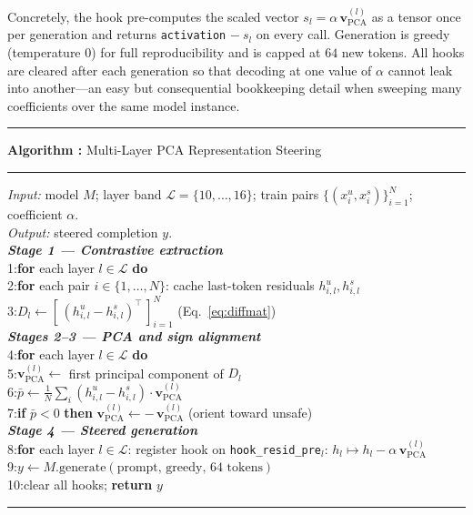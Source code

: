 \documentclass[11pt,a4paper]{article}
\newcounter{algocounter}
\newenvironment{algobox}[1]{%
  \par\medskip\refstepcounter{algocounter}%
  \begin{center}\begin{minipage}{0.95\linewidth}%
  \hrule\vspace{3pt}%
  {\sffamily\bfseries Algorithm \thealgocounter:} #1\vspace{3pt}\hrule\vspace{5pt}\small}%
{\vspace{4pt}\hrule\end{minipage}\end{center}\medskip}
\newcommand{\vpca}{\mathbf{v}_{\text{PCA}}}
\begin{document}
Concretely, the hook pre-computes the scaled vector $s_l = \alpha\,\vpca^{(l)}$ as a tensor once per generation and returns \texttt{activation} $-\ s_l$ on every call. Generation is greedy (temperature $0$) for full reproducibility and is capped at $64$ new tokens. All hooks are cleared after each generation so that decoding at one value of $\alpha$ cannot leak into another---an easy but consequential bookkeeping detail when sweeping many coefficients over the same model instance.

\begin{algobox}{Multi-Layer PCA Representation Steering}
\label{alg:pipeline}
\textit{Input:} model $M$; layer band $\mathcal{L}=\{10,\dots,16\}$; train pairs $\{(x^u_i,x^s_i)\}_{i=1}^{N}$; coefficient $\alpha$.\\
\textit{Output:} steered completion $y$.\\[4pt]
\textbf{\textit{Stage 1 --- Contrastive extraction}}\\
1:\quad \textbf{for} each layer $l \in \mathcal{L}$ \textbf{do}\\
2:\quad\quad \textbf{for} each pair $i \in \{1,\dots,N\}$: cache last-token residuals $h^u_{i,l}, h^s_{i,l}$\\
3:\quad\quad $D_l \gets [\,(h^u_{i,l}-h^s_{i,l})^{\top}\,]_{i=1}^{N}$ \hfill (Eq.~\ref{eq:diffmat})\\[4pt]
\textbf{\textit{Stages 2--3 --- PCA and sign alignment}}\\
4:\quad \textbf{for} each layer $l \in \mathcal{L}$ \textbf{do}\\
5:\quad\quad $\vpca^{(l)} \gets$ first principal component of $D_l$\\
6:\quad\quad $\bar p \gets \tfrac{1}{N}\sum_i (h^u_{i,l}-h^s_{i,l})\cdot \vpca^{(l)}$\\
7:\quad\quad \textbf{if} $\bar p < 0$ \textbf{then} $\vpca^{(l)} \gets -\,\vpca^{(l)}$ \hfill (orient toward unsafe)\\[4pt]
\textbf{\textit{Stage 4 --- Steered generation}}\\
8:\quad \textbf{for} each layer $l \in \mathcal{L}$: register hook on \texttt{hook\_resid\_pre}$_l$: $h_l \mapsto h_l - \alpha\,\vpca^{(l)}$\\
9:\quad $y \gets M.\text{generate}(\text{prompt, greedy, 64 tokens})$\\
10:\quad clear all hooks; \textbf{return} $y$
\end{algobox}
\end{document}
